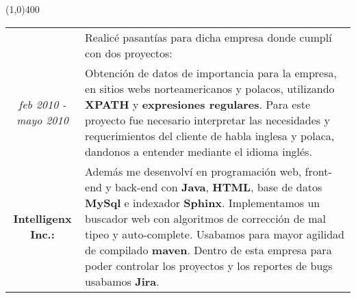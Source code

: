 \begin{center}
\line(1,0){400}
\end{center}
\noindent
\begin{tabular}{c|p{12.5cm}}
& \large Realicé pasantías para dicha empresa donde cumplí con dos proyectos:\\
\large\textit{feb 2010 - mayo 2010} & \large Obtención de datos de importancia para la empresa, en sitios webs norteamericanos y polacos, utilizando \textbf{XPATH} y \textbf{expresiones regulares}. Para este proyecto fue necesario interpretar las necesidades y requerimientos del cliente de habla inglesa y polaca, dandonos a entender mediante el idioma inglés.\\
\large\textbf{Intelligenx Inc.:} & \large Además me desenvolví en programación web, front-end y back-end con \textbf{Java}, \textbf{HTML}, base de datos \textbf{MySql} e indexador \textbf{Sphinx}. Implementamos un buscador web con algoritmos de corrección de mal tipeo y auto-complete. Usabamos para mayor agilidad de compilado \textbf{maven}. Dentro de esta empresa para poder controlar los proyectos y los reportes de bugs usabamos \textbf{Jira}.
\end{tabular}

